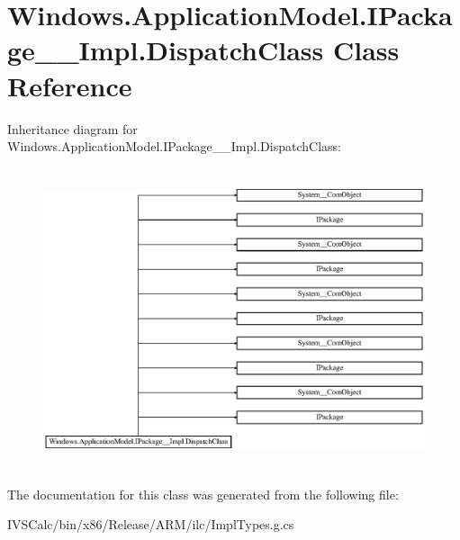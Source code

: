 \hypertarget{class_windows_1_1_application_model_1_1_i_package_____impl_1_1_dispatch_class}{}\section{Windows.\+Application\+Model.\+I\+Package\+\_\+\+\_\+\+Impl.\+Dispatch\+Class Class Reference}
\label{class_windows_1_1_application_model_1_1_i_package_____impl_1_1_dispatch_class}
Inheritance diagram for Windows.\+Application\+Model.\+I\+Package\+\_\+\+\_\+\+Impl.\+Dispatch\+Class\+:\begin{figure}[H]
\begin{center}
\leavevmode
\includegraphics[height=8.850575cm]{class_windows_1_1_application_model_1_1_i_package_____impl_1_1_dispatch_class}
\end{center}
\end{figure}


The documentation for this class was generated from the following file\+:\begin{DoxyCompactItemize}
\item 
I\+V\+S\+Calc/bin/x86/\+Release/\+A\+R\+M/ilc/Impl\+Types.\+g.\+cs\end{DoxyCompactItemize}
